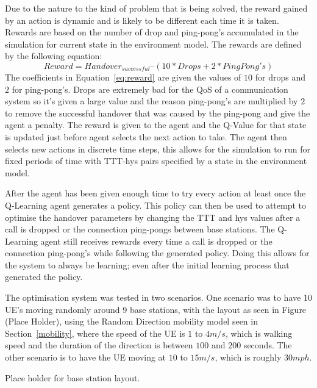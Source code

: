 Due to the nature to the kind of problem that is being solved, the reward gained by an action is dynamic and is likely to be different each time it is taken. Rewards are based on the number of drop and ping-pong's accumulated in the simulation for current state in the environment model. The rewards are defined by the following equation:
\begin{equation}\label{eq:reward}
Reward = Handover_{successful} – (10*Drops + 2*PingPong's)
\end{equation}
The coefficients in Equation~\ref{eq:reward} are given the values of $10$ for drops and $2$ for ping-pong's. Drops are extremely bad for the QoS of a communication system so it's given a large value and the reason ping-pong's are multiplied by $2$ to remove the successful handover that was caused by the ping-pong and give the agent a penalty. The reward is given to the agent and the Q-Value for that state is updated just before agent selects the next action to take.  The agent then selects new actions in discrete time steps, this allows for the simulation to run for fixed periods of time with TTT-hys pairs specified by a state in the environment model. 

After the agent has been given enough time to try every action at least once the Q-Learning agent generates a policy. This policy can then be used to attempt to optimise the handover parameters by changing the TTT and hys values after a call is dropped or the connection ping-pongs between base stations. The Q-Learning agent still receives rewards every time a call is dropped or the connection ping-pong's while following the generated policy. Doing this allows for the system to always be learning; even after the initial learning process that generated the policy.

The optimisation system was tested in two scenarios. One scenario was to have 10 UE's moving randomly around 9 base stations, with the layout as seen in Figure (Place Holder), using the Random Direction mobility model seen in Section~\ref{mobility}, where the speed of the UE is $1$ to $4 m/s$, which is walking speed and the duration of the direction is between $100$ and $200$ seconds. The other scenario is to have the UE moving at $10$ to $15 m/s$, which is roughly $30 mph$.

Place holder for base station layout.

